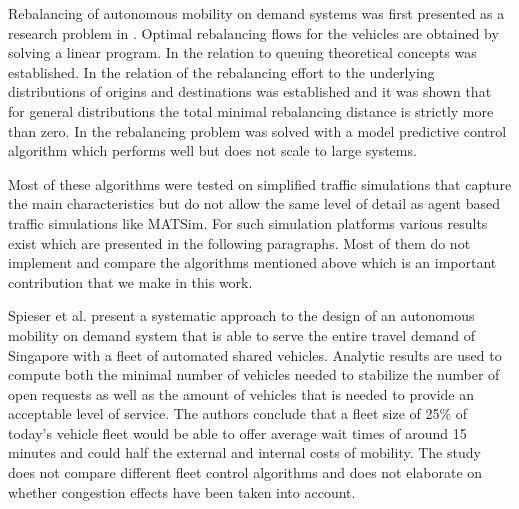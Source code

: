 Rebalancing of autonomous mobility on demand systems was first presented as a research
 problem in \citep{pavone2011load}. Optimal rebalancing flows for the vehicles are
 obtained by solving a linear program. In \citep{zhang2016control} the relation to
 queuing theoretical concepts was established. In \citep{treleaven2011asymptotically}
 the relation of the rebalancing effort to the underlying distributions of origins
 and destinations was established and it was shown that for general distributions
 the total minimal rebalancing distance is strictly more than zero.
 In   \citep{zhang2016model} the rebalancing problem was solved with a model
 predictive control algorithm which performs well but does not scale to large systems.

Most of these algorithms were tested on simplified traffic simulations that capture
the main characteristics but do not allow the same level of detail as agent based
traffic simulations like MATSim. For such simulation platforms various results
exist which are presented in the following paragraphs. Most of them do not
implement and compare the algorithms mentioned above which is an important
contribution that we make in this work.

Spieser et al. \cite{spieser2014toward} present a systematic approach to the
design of an autonomous mobility on demand system that is able to serve the entire
travel demand of Singapore with a fleet of automated shared vehicles. Analytic
results are used to compute both the minimal number of vehicles needed to stabilize
the number of open requests as well as the amount of vehicles that is needed to
provide an acceptable level of service. The authors conclude that a fleet size
of 25\% of today's vehicle fleet would be able to offer average wait times of
around 15 minutes and could half the external and internal costs of mobility.
The study does not compare different fleet control algorithms and does not
elaborate on whether congestion effects have been taken into account.

